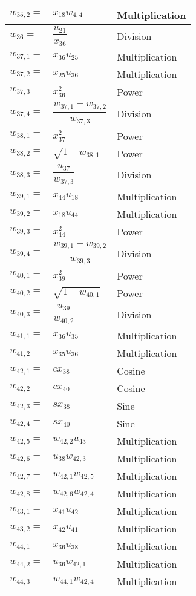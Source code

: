 \begin{longtable}{|p{1.5cm}|l|p{2cm}|}
$w_{35,2}=$ & $ x_{18}w_{4,4} $ & Multiplication \\ \hline 
$w_{36}=$ & $ \dfrac{u_{21}}{x_{36}} $ & Division \\ \hline 
$w_{37,1}=$ & $ x_{36}u_{25} $ & Multiplication \\ \hline 
$w_{37,2}=$ & $ x_{25}u_{36} $ & Multiplication \\ \hline 
$w_{37,3}=$ & $ x_{36}^{2} $ & Power \\ \hline 
$w_{37,4}=$ & $ \dfrac{w_{37,1}-w_{37,2}}{w_{37,3}} $ & Division \\ \hline 
$w_{38,1}=$ & $ x_{37}^{2} $ & Power \\ \hline 
$w_{38,2}=$ & $ \sqrt{1-w_{38,1}} $ & Power \\ \hline 
$w_{38,3}=$ & $ \dfrac{u_{37}}{w_{37,3}} $ & Division \\ \hline 
$w_{39,1}=$ & $ x_{44}u_{18} $ & Multiplication \\ \hline 
$w_{39,2}=$ & $ x_{18}u_{44} $ & Multiplication \\ \hline 
$w_{39,3}=$ & $ x_{44}^{2} $ & Power \\ \hline 
$w_{39,4}=$ & $ \dfrac{w_{39,1}-w_{39,2}}{w_{39,3}} $ & Division \\ \hline 
$w_{40,1}=$ & $ x_{39}^{2} $ & Power \\ \hline 
$w_{40,2}=$ & $ \sqrt{1-w_{40,1}} $ & Power \\ \hline 
$w_{40,3}=$ & $ \dfrac{u_{39}}{w_{40,2}} $ & Division \\ \hline 
$w_{41,1}=$ & $ x_{36}u_{35} $ & Multiplication \\ \hline 
$w_{41,2}=$ & $ x_{35}u_{36} $ & Multiplication \\ \hline 
$w_{42,1}=$ & $ cx_{38} $ & Cosine \\ \hline 
$w_{42,2}=$ & $ cx_{40} $ & Cosine \\ \hline 
$w_{42,3}=$ & $ sx_{38} $ & Sine \\ \hline 
$w_{42,4}=$ & $ sx_{40} $ & Sine \\ \hline 
$w_{42,5}=$ & $ w_{42,2}u_{43} $ & Multiplication \\ \hline 
$w_{42,6}=$ & $ u_{38}w_{42,3} $ & Multiplication\\ \hline 
$w_{42,7}=$ & $ w_{42,1}w_{42,5} $ & Multiplication \\ \hline 
$w_{42,8}=$ & $ w_{42,6}w_{42,4} $ & Multiplication \\ \hline 
$w_{43,1}=$ & $ x_{41}u_{42} $ & Multiplication \\ \hline 
$w_{43,2}=$ & $ x_{42}u_{41} $ & Multiplication \\ \hline 
$w_{44,1}=$ & $ x_{36}u_{38} $ & Multiplication \\ \hline
$w_{44,2}=$ & $ u_{36}w_{42,1} $ & Multiplication \\ \hline
$w_{44,3}=$ & $ w_{44,1}w_{42,4} $ & Multiplication \\ \hline
\end{longtable}

